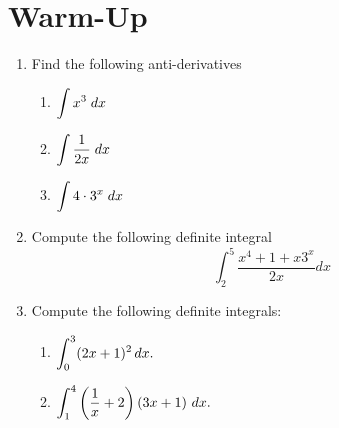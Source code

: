 \documentclass[10pt]{article}
\begin{document}
\pagestyle{otherpages}
\thispagestyle{firstpage}



\section{Warm-Up}
\begin{enumerate}
    \item Find the following anti-derivatives 
    \begin{enumerate}
        \item $\displaystyle \int x^3 \;dx$\vfill
        \item $\displaystyle \int \frac{1}{2x} \;dx$\vfill
        \item $\displaystyle  \int 4\cdot3^x\;dx$\vfill
    \end{enumerate}
    \item Compute the following definite integral
    \[\int_2^5 \frac{x^4+1 + x3^x}{2x}dx\]\vfill\vfill
    \item Compute the following definite integrals:
    \begin{enumerate}
        \item $\displaystyle \int_0^3 (2x+1)^2\,dx.$\vfill\vfill
         \item $\displaystyle \int_1^4 \left(\frac 1x + 2\right)\left(3x + 1\right)\,dx.$\vfill\vfill
    \end{enumerate}    

\end{enumerate}

\newpage
\end{document}
